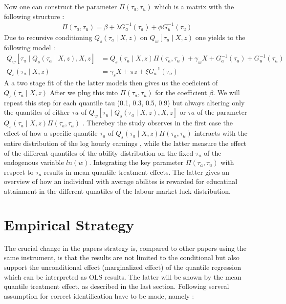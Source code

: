 \documentclass[12pt,a4paper]{article}
\begin{document}
Now one can construct the parameter \(\Pi(\tau_a,\tau_u)\) which is a
matrix with the following structure : \begin{align} \Pi\left(\tau_{a},
 \tau_{u}\right)=\beta+\lambda G_{a}^{-1}\left(\tau_{a}\right)+\phi
 G_{u}^{-1}\left(\tau_{u}\right)
 \end{align} Due to recursive conditioning
\(Q_{s}\left(\tau_{a}\mid X,z\right)\) on
\(Q_{w}\left[\tau_{u}\mid X,z\right)\) one yields to the following model
: \begin{align} Q_{w}\left[\tau_{u}
 \mid Q_s\left(\tau_{a} \mid X, z\right), X, z\right]&=Q_s\left(\tau_{a}
 \mid X, z\right) \Pi\left(\tau_{a}, \tau_{u}\right)+\gamma_{w}
 X+G_{a}^{-1}\left(\tau_{a}\right)+G_{u}^{-1}\left(\tau_{u}\right)&  \\
 Q_{s}\left(\tau_{a} \mid X, z\right)&=\gamma_{s} X+\pi z+\xi
 G_{a}^{-1}\left(\tau_{a}\right) & 
 \end{align} A a two stage fit of the the latter models then gives us
the coeficient of \(Q_s\left(\tau_{a}\mid X, z\right)\) After we plug
this into \(\Pi\left(\tau_{a},\tau_{u}\right)\) for the coefficient
\(\beta\). We will repeat this step for each quantile tau (0.1, 0.3,
0.5, 0.9) but always altering only the quantiles of either \(\tau{u}\)
of
\(Q_{w}\left[\tau_{u}\mid Q_s\left(\tau_{a} \mid X, z\right), X, z\right]\)
or \(\tau{a}\) of the parameter
\(Q_s\left(\tau_{a}\mid X, z\right) \Pi\left(\tau_{a}, \tau_{u}\right)\)
. Therebey the study observes in the first case the effect of how a
specific quantile \(\tau_a\) of
\(Q_s\left(\tau_{a}\mid X, z\right)\Pi\left(\tau_{a},\tau_{u}\right)\)
interacts with the entire distribution of the log hourly earnings ,
while the latter measure the effect of the different quantiles of the
ability distribution on the fixed \(\tau_u\) of the endogenous variable
\(ln(w)\). Integrating the key parameter
\(\Pi\left(\tau_{a},\tau_{u}\right)\) with respect to \(\tau_a\) results
in mean quantile treatment effects. The latter gives an overview of how
an individual with average abilites is rewarded for educatinal
attainment in the different qunatiles of the labour market luck
distribution.

\hypertarget{empirical-strategy}{%
\section{Empirical Strategy}\label{empirical-strategy}}

The crucial change in the papers strategy is, compared to other papers
using the same instrument, is that the results are not limited to the
conditional but also support the unconditional effect (marginalized
effect) of the quantile regression which can be interpreted as OLS
results. The latter will be shown by the mean quantile treatment effect,
as described in the last section. Following \textcite{brunello} serveal
assumption for correct identification have to be made, namely :
\end{document}
